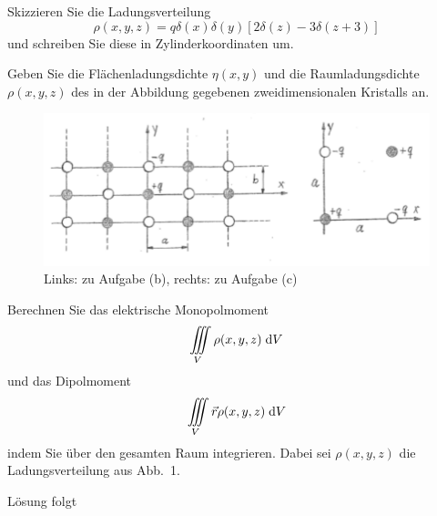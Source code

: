 \documentclass{atistandalonetask}
\begin{document}
  \begin{atiTask}[
    title = Ionenkristalle
  ]
    \begin{atiSubtasks}
    	\item Skizzieren Sie die Ladungsverteilung 
    	\[
    	\rho(x,y,z)=q\delta(x)\delta(y)[2\delta(z)-3\delta(z+3)]
    	\]
    	und schreiben Sie diese in Zylinderkoordinaten um. 
    	\item Geben Sie die Flächenladungsdichte $\eta(x,y)$ und die Raumladungsdichte $\rho(x,y,z)$ des in der Abbildung gegebenen zweidimensionalen Kristalls an.
    	\begin{figure}[H]
		\centering
		\includegraphics[width=0.7\linewidth]{./picture-delta_v}
		\caption{Links: zu Aufgabe (b), rechts: zu Aufgabe (c)}
		\end{figure}
    	\item Berechnen Sie das elektrische Monopolmoment
    	\[
    	\iiint\limits_V\rho(x,y,z)\;\mathrm{d} V
    	\]
    	und das Dipolmoment
    	\[
    	\iiint\limits_V\vec{r}\rho(x,y,z)\;\mathrm{d} V
    	\]
    	indem Sie über den gesamten Raum integrieren. Dabei sei $\rho(x,y,z)$ die Ladungsverteilung aus Abb.~1.
    \end{atiSubtasks}	
  \end{atiTask}
  \begin{atiSolution}
   	Lösung folgt
  \end{atiSolution}
\end{document}
